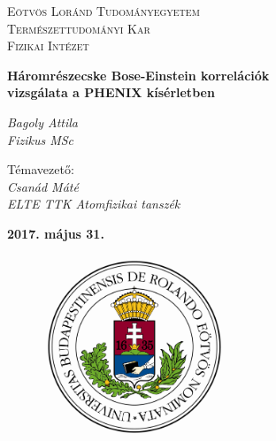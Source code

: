 \documentclass[11pt,a4paper]{article}
\title{}
\numberwithin{equation}{subsection}
\numberwithin{figure}{section}
\begin{document}
\pagestyle{empty}


\begin{titlepage}

\center

\textsc{\LARGE  Eötvös Loránd Tudományegyetem}\\[0.5cm]
\textsc{\LARGE Természettudományi Kar}\\[0.5cm]
\textsc{\LARGE Fizikai Intézet}\\[1.5cm]
\vspace{7mm}

{ \huge \bfseries Háromrészecske Bose-Einstein korrelációk  }\\[0.2cm]
{ \huge \bfseries vizsgálata a PHENIX kísérletben}\\[0.4cm] %
\vspace{6mm}

\begin{center}
\LARGE \textit{Bagoly Attila}\\
\Large \textit{Fizikus MSc}\\
\end{center}

\begin{center}
\LARGE Témavezető: \\
\LARGE \textit{Csanád Máté}\\
\Large \textit{ELTE TTK Atomfizikai tanszék}\\
\end{center}

\vspace{4mm}
\begin{Large}
\textbf{2017. május 31.}
\end{Large}
\vspace{2mm}

\begin{figure}[H] 
\centerline{ 
\includegraphics[height=5.5cm]{pic/ELTE_logo.png} 
} 
\end{figure}


\end{titlepage}
\end{document}
